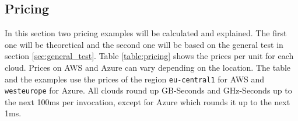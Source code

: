 \begin{table}[htp]
\centering
\captionsetup[table]{justification=centering, labelfont=bf}
\caption[Load tests that achieved less than 90\% of RPS]{Load tests that achieved less than 90\% of RPS}
\label{table:rps}
\end{table}

\subsection{Pricing}
\label{sec:pricing}
In this section two pricing examples will be calculated and explained. The first one will be theoretical and the second one will be based on the general test in section \ref{sec:general_test}. Table \ref{table:pricing} shows the prices per unit for each cloud. Prices on \gls{AWS} and Azure can vary depending on the location. The table and the examples use the prices of the region \texttt{eu-central1} for \gls{AWS} and \texttt{westeurope} for Azure. All clouds round up GB-Seconds and GHz-Seconds up to the next 100ms per invocation, except for Azure which rounds it up to the next 1ms.

